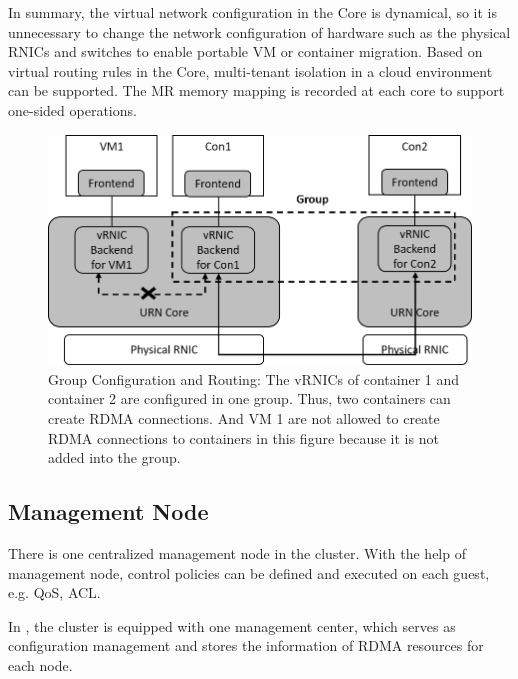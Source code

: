 
In summary, the virtual network configuration in the \sys Core is dynamical, so it is unnecessary to change the network configuration of hardware such as the physical RNICs and switches to enable portable VM or container migration. Based on virtual routing rules in the \sys Core, multi-tenant isolation in a cloud environment can be supported. The MR memory mapping is recorded at each \sys core to support one-sided operations.

\begin{figure}[!ht]
	\centering
	\includegraphics[width=1.0\linewidth]{images/route-config}
	\caption{Group Configuration and Routing: The vRNICs of container 1 and container 2 are configured in one group. Thus, two containers can create RDMA connections. And VM 1 are not allowed to create RDMA connections to containers in this figure because it is not added into the group. }
	\label{fig:route-config}
\end{figure}

\subsection{Management Node}

There is one centralized management node in the cluster. With the help of management node, control policies can be defined and executed on each guest, e.g. QoS, ACL.


In \sys, the cluster is equipped with one management center, which serves as configuration management and stores the information of RDMA resources for each node.

